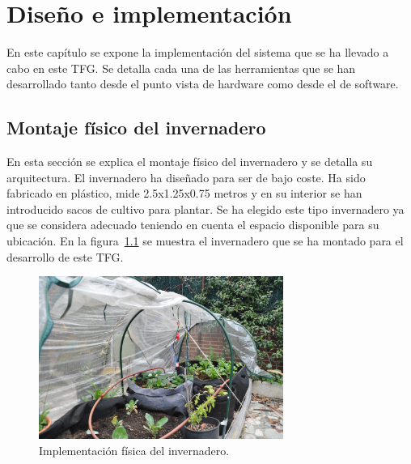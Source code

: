 \documentclass[a4paper, 12pt, oneside]{book}
\begin{document}

\cleardoublepage
\chapter{Diseño e implementación}
\label{chap:diseño e implementación}
En este capítulo se expone la implementación del sistema que se ha llevado a cabo en este TFG. Se detalla cada una de las herramientas que se han desarrollado tanto desde el punto vista de hardware como desde el de software.

\section{Montaje físico del invernadero}
\label{sec: montaje físico del invernadero}
En esta sección se explica el montaje físico del invernadero y se detalla su arquitectura.
El invernadero ha diseñado para ser de bajo coste. Ha sido fabricado en plástico, mide 2.5x1.25x0.75 metros y en su interior se han introducido sacos de cultivo para plantar. Se ha elegido este tipo invernadero ya que se considera adecuado teniendo en cuenta el espacio disponible para su ubicación. En la figura~\ref{figura:invernadero} se muestra el invernadero que se ha montado para el desarrollo de este TFG.
\begin{figure}[H]
	\centering
    \includegraphics[width=8cm, keepaspectratio]{img/invernadero}
    \caption{Implementación física del invernadero.}
    \label{figura:invernadero}
\end{figure}
\end{document}
